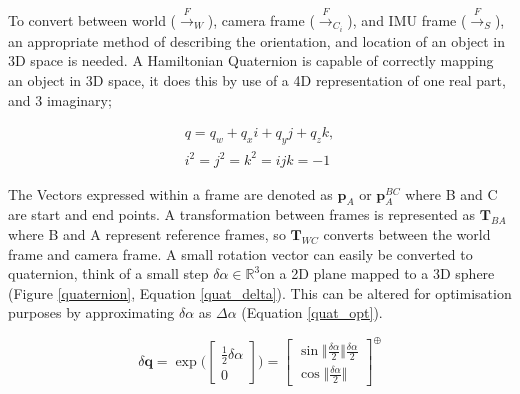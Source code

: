\documentclass[a4paper,11pt,notitlepage]{article}
\begin{document}

To convert between world (${\xrightarrow{F}}_{W}$), camera frame (${\xrightarrow{F}}_{C_{i}}$), and IMU frame (${\xrightarrow{F}}_{S}$), an appropriate method of describing the orientation, and location of an object in 3D space is needed. A Hamiltonian Quaternion is capable of correctly mapping an object in 3D space, it does this by use of a 4D representation of one real part, and 3 imaginary;  

\begin{equation}
\begin{aligned}
\label{quaternion}
q = q_{w} + q_{x}i + q_{y}j+q_{z}k, \\
i^{2}=j^{2}=k^{2}=ijk=-1
\end{aligned}
\end{equation}

The Vectors expressed within a frame are denoted as $\textbf{p}_{A}$ or $\textbf{p}_{A}^{BC}$ where B and C are start and end points. A transformation between frames is represented as $\textbf{T}_{BA}$ where B and A represent reference frames, so $\textbf{T}_{WC}$ converts between the world frame and camera frame. A small rotation vector can easily be converted to quaternion, think of a small step $\delta \alpha \in \mathbb{R}^{3}$on a 2D plane mapped to a 3D sphere (Figure \ref{quaternion}, Equation \ref{quat_delta}). This can be altered for optimisation purposes by approximating $\delta \alpha$ as $\Delta \alpha$ (Equation \ref{quat_opt}).


\begin{equation}
\label{quat_delta}
\delta \textbf{q} = \exp{ \bigg(
    \begin{bmatrix}
        \frac{1}{2}\delta \alpha \\[0.3em]
       0
     \end{bmatrix} \bigg) }= \begin{bmatrix}
        \sin \Vert \frac{\delta \alpha}{2} \Vert \frac{\delta \alpha}{2} \\[0.3em]
       \cos \Vert \frac{\delta \alpha}{2} \Vert
     \end{bmatrix} ^{\oplus}
\end{equation}
\end{document}
